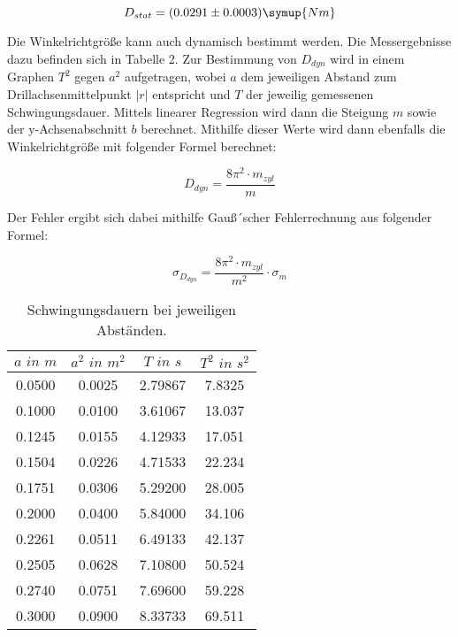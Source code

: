 \begin{equation}
  D_{stat} = (0.0291 \pm 0.0003) \symup{Nm}
\end{equation}

Die Winkelrichtgröße kann auch dynamisch bestimmt werden. Die Messergebnisse dazu befinden sich
in Tabelle 2. Zur Bestimmung von $D_{dyn}$ wird in einem Graphen $T^2$ gegen $a^2$ aufgetragen,
wobei $a$ dem jeweiligen Abstand zum Drillachsenmittelpunkt $\lvert r \rvert$ entspricht und $T$
der jeweilig gemessenen Schwingungsdauer. Mittels linearer Regression wird dann die Steigung $m$ sowie
der y-Achsenabschnitt $b$ berechnet. Mithilfe dieser Werte wird dann ebenfalls die
Winkelrichtgröße mit folgender Formel berechnet:

\begin{equation}
  D_{dyn} = \frac{8\pi^2 \cdot m_{zyl}}{m}
\end{equation}

Der Fehler ergibt sich dabei mithilfe Gauß´scher Fehlerrechnung aus folgender Formel:

\begin{equation}
  \sigma_{D_{dyn}} = \frac{8 \pi^2 \cdot m_{zyl}}{m^2} \cdot \sigma_m
\end{equation}

\begin{table}
  \centering
  \caption{Schwingungsdauern bei jeweiligen Abständen.}
  \label{tab:data2}
  \begin{tabular}{c c c c }
    \toprule $a \, \,  in \,\, m$ & $a^2 \,\, in \,\,  m^2$ & $T \,\, in \,\, s$ & $T^2 \,\, in  \,\, s^2$ \\
    \midrule
    0.0500 & 0.0025 & 2.79867 &  7.8325\\
    0.1000 & 0.0100 & 3.61067 &  13.037\\
    0.1245 & 0.0155 & 4.12933 &  17.051\\
    0.1504 & 0.0226 & 4.71533 &  22.234\\
    0.1751 & 0.0306 & 5.29200 &  28.005\\
    0.2000 & 0.0400 & 5.84000 &  34.106\\
    0.2261 & 0.0511 & 6.49133 &  42.137\\
    0.2505 & 0.0628 & 7.10800 &  50.524\\
    0.2740 & 0.0751 & 7.69600 &  59.228\\
    0.3000 & 0.0900 & 8.33733 &  69.511\\
    \bottomrule
  \end{tabular}
\end{table}

